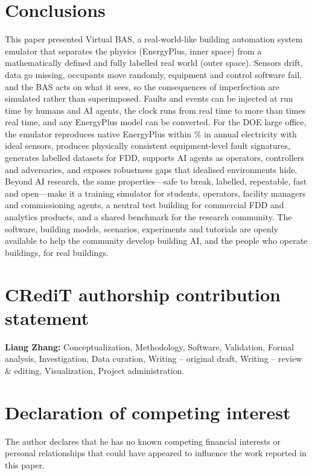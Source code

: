 \documentclass[preprint,12pt,authoryear=false]{elsarticle}
\begin{document}
\section{Conclusions}
\label{sec:conclusions}

This paper presented Virtual BAS, a real-world-like building automation system emulator that separates the physics
(EnergyPlus, inner space) from a mathematically defined and fully labelled real world (outer space). Sensors drift,
data go missing, occupants move randomly, equipment and control software fail, and the BAS acts on what it sees, so the
consequences of imperfection are simulated rather than superimposed. Faults and events can be injected at run time
by humans and AI agents, the clock runs from real time to more than \SpeedMaxK{} times real time, and any EnergyPlus
model can be converted. For the DOE large office, the emulator reproduces native EnergyPlus within \ValElecDiffAbs\%
in annual electricity with ideal sensors, produces physically consistent equipment-level fault signatures, generates
labelled datasets for FDD, supports AI agents as operators, controllers and adversaries, and exposes robustness gaps
that idealised environments hide. Beyond AI research, the same properties---safe to break, labelled, repeatable, fast
and open---make it a training simulator for students, operators, facility managers and commissioning agents, a neutral
test building for commercial FDD and analytics products, and a shared benchmark for the research community. The
software, building models, scenarios, experiments and tutorials are openly available to help the community develop
building AI, and the people who operate buildings, for real buildings.

\section*{CRediT authorship contribution statement}
\textbf{Liang Zhang:} Conceptualization, Methodology, Software, Validation, Formal analysis, Investigation, Data
curation, Writing -- original draft, Writing -- review \& editing, Visualization, Project administration.

\section*{Declaration of competing interest}
The author declares that he has no known competing financial interests or personal relationships that could have
appeared to influence the work reported in this paper.
\end{document}
